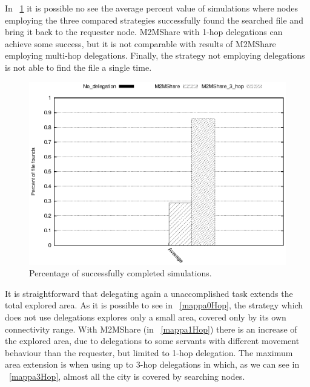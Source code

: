 In \figurename~\ref{graficoPercCompletedMultiHop} it is possible no see the average percent value of simulations where nodes employing the three compared strategies successfully found the searched file and bring it back to the requester node. M2MShare with 1-hop delegations can achieve some success, but it is not comparable with results of M2MShare employing multi-hop delegations. Finally, the strategy not employing delegations is not able to find the file a single time.

\begin{figure}[ht]
\begin{minipage}[b]{1\linewidth}
\centering
\includegraphics[scale=0.5]{grafici/percCompletaMultiHop.eps}
\caption{Percentage of successfully completed simulations.}
\label{graficoPercCompletedMultiHop}
\end{minipage}
\end{figure}

It is straightforward that delegating again a unaccomplished task extends the total explored area. As it is possible to see in \figurename~\ref{mappa0Hop}, the strategy which does not use delegations explores only a small area, covered only by its own connectivity range. With M2MShare (in \figurename~\ref{mappa1Hop}) there is an increase of the explored area, due to delegations to some servants with different movement behaviour than the requester, but limited to 1-hop delegation. The maximum area extension is when using up to 3-hop delegations in which, as we can see in \figurename~\ref{mappa3Hop}, almost all the city is covered by searching nodes.

